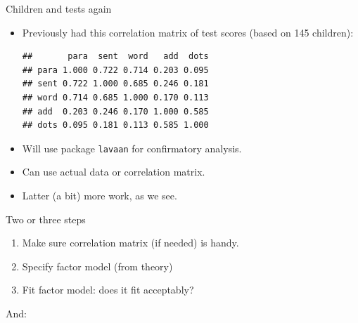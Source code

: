 \begin{frame}[fragile]{Children and tests again}

\begin{itemize}
\item
Previously had this correlation matrix of test scores (based on 145
children):

\begin{knitrout}
\color{fgcolor}\begin{kframe}
\begin{alltt}
\end{alltt}
\begin{verbatim}
##       para  sent  word   add  dots
## para 1.000 0.722 0.714 0.203 0.095
## sent 0.722 1.000 0.685 0.246 0.181
## word 0.714 0.685 1.000 0.170 0.113
## add  0.203 0.246 0.170 1.000 0.585
## dots 0.095 0.181 0.113 0.585 1.000
\end{verbatim}
\end{kframe}
\end{knitrout}

\item Will use package \texttt{lavaan} for confirmatory analysis.
\item Can use actual data or correlation matrix.
\item Latter (a bit) more work, as we see.

\end{itemize}
\end{frame}

\begin{frame}[fragile]{Two or three steps}
  
  \begin{enumerate}
  \item Make sure correlation matrix (if needed) is handy.
  \item Specify factor model (from theory)
  \item Fit factor model: does it fit acceptably? 
  \end{enumerate}
  
  And:
  
\begin{knitrout}
\color{fgcolor}\begin{kframe}
\begin{alltt}
\end{alltt}


{\ttfamily\noindent\itshape\color{messagecolor}{\#\# Loading required package: methods\\\#\# This is lavaan 0.5-20\\\#\# lavaan is BETA software! Please report any bugs.}}\end{kframe}
\end{knitrout}
  
\end{frame}

